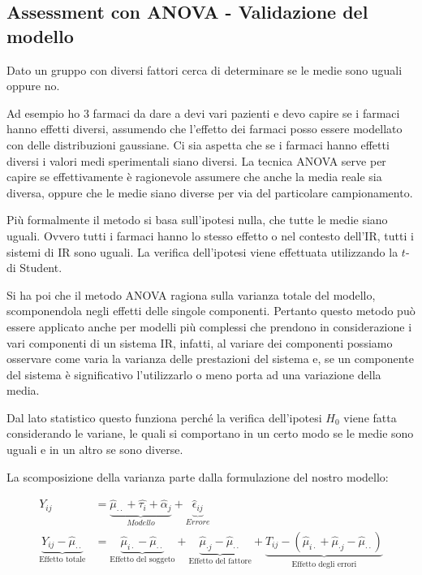 

\subsection{Assessment con ANOVA - Validazione del modello}

Dato un gruppo con diversi fattori cerca di determinare se le medie sono uguali oppure no.

Ad esempio ho 3 farmaci da dare a devi vari pazienti e devo capire se i farmaci hanno effetti diversi, assumendo che l'effetto dei farmaci posso essere modellato con delle distribuzioni gaussiane.
Ci sia aspetta che se i farmaci hanno effetti diversi i valori medi sperimentali siano diversi. 
La tecnica ANOVA serve per capire se effettivamente è ragionevole assumere che anche la media reale sia diversa, oppure che le medie siano diverse per via del particolare campionamento.

Più formalmente il metodo si basa sull'ipotesi nulla, che tutte le medie siano uguali. Ovvero tutti i farmaci hanno lo stesso effetto o nel contesto dell'IR, tutti i sistemi di IR sono uguali.
La verifica dell'ipotesi viene effettuata utilizzando la $t$-di Student.

Si ha poi che il metodo ANOVA ragiona sulla varianza totale del modello, scomponendola negli effetti delle singole componenti.
Pertanto questo metodo può essere applicato anche per modelli più complessi che prendono in considerazione i vari componenti di un sistema IR, infatti, al variare dei componenti possiamo osservare come varia la varianza delle prestazioni del sistema e, se un componente del sistema è significativo l'utilizzarlo o meno porta ad una variazione della media.

Dal lato statistico questo funziona perché la verifica dell'ipotesi $H_0$ viene fatta considerando le variane, le quali si comportano in un certo modo se le medie sono uguali e in un altro se sono diverse.

La scomposizione della varianza parte dalla formulazione del nostro modello:

\begin{align*}
Y_{ij} &= \underbrace{\hat{\mu}_{\cdot \cdot} + \hat{\tau_i} + \hat{\alpha}_j}_{Modello} + \underbrace{\hat{\epsilon}_{ij}}_{Errore} \\
\underbrace{Y_{ij} - \hat{\mu}_{\cdot \cdot}}_{\text{Effetto totale}} &= \underbrace{\hat{\mu}_{i\cdot} - \hat{\mu}_{\cdot \cdot}}_{\text{Effetto del soggeto}}  + \underbrace{\hat{\mu}_{\cdot j} - \hat{\mu}_{\cdot \cdot}}_{\text{Effetto del fattore}} + \underbrace{T_{ij} - (\hat{\mu}_{i \cdot }+ \hat{\mu}_{\cdot j} - \hat{\mu}_{\cdot \cdot}  )}_{\text{Effetto degli errori}}
\end{align*}

